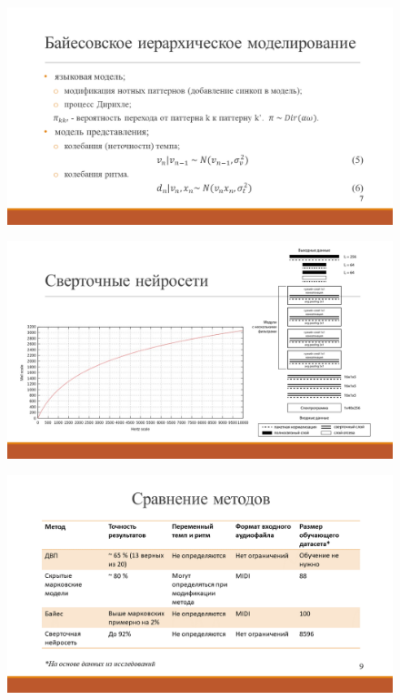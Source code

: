 \begin{figure}[h!]
	\begin{center}
		\includegraphics[angle=90,scale=0.75]{slides/Slide7.png}
	\end{center}
\end{figure}

\begin{figure}[h!]
	\begin{center}
		\includegraphics[angle=90,scale=0.75]{slides/Slide8.png}
	\end{center}
\end{figure}

\begin{figure}[h!]
	\begin{center}
		\includegraphics[angle=90,scale=0.75]{slides/Slide9.png}
	\end{center}
\end{figure}


